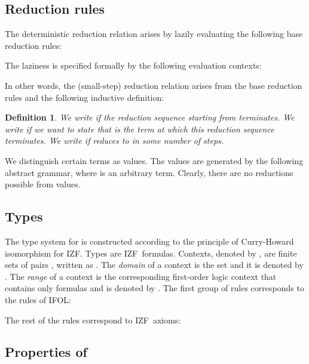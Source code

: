 \documentclass{LMCS}
\newtheorem{definition}[thm]{Definition}
\newcommand{\todo}[1]{}
\newcommand{\izfr}{IZF}
\newcommand{\iizfr}{IZF}
\begin{document}
\subsection{Reduction rules}\label{rr}

The deterministic reduction relation  arises by lazily evaluating the
following base reduction rules:






The laziness is specified formally by the following evaluation contexts:


In other words, the (small-step) reduction relation arises from the base
reduction rules and the following inductive definition:





\begin{definition}
We write  if the reduction sequence starting from 
terminates. We write  if we want to state that 
is the term at which this reduction sequence terminates. We write  if
 reduces to  in some number of steps. \todo{Better formulation?}
\end{definition}

We distinguish certain  terms as values. The values are generated
by the following abstract grammar, where  is an arbitrary term. Clearly, there are
no reductions possible from values. 


\subsection{Types}\label{lambdaa}

The type system for  is constructed according to the principle
of Curry-Howard isomorphism for \iizfr. Types are \izfr\ formulas.
Contexts, denoted by , are finite sets of pairs , written
as . The \emph{domain} of a context
 is the set  and it is denoted by .  The \emph{range} of a context  is the corresponding first-order logic context that contains
only formulas and is denoted by . The first group of rules
corresponds to the rules of IFOL:







The rest of the rules correspond to \iizfr\ axioms:



\subsection{Properties of }
\end{document}
